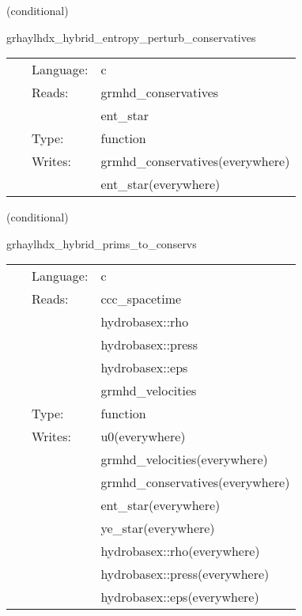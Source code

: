 \vspace{5mm}

   (conditional) 

\hspace{5mm} grhaylhdx\_hybrid\_entropy\_perturb\_conservatives 

\hspace{5mm}{\it entropy+hybrid version of grhaylhdx\_perturb\_conservatives } 


\hspace{5mm}

 \begin{tabular*}{160mm}{cll} 
~ & Language:  & c \\ 
~ & Reads:  & grmhd\_conservatives \\ 
~& ~ &ent\_star\\ 
~ & Type:  & function \\ 
~ & Writes:  & grmhd\_conservatives(everywhere) \\ 
~& ~ &ent\_star(everywhere)\\ 
\end{tabular*} 


\vspace{5mm}

   (conditional) 

\hspace{5mm} grhaylhdx\_hybrid\_prims\_to\_conservs 

\hspace{5mm}{\it hybrid version of grhaylhdx\_prims\_to\_conservs } 


\hspace{5mm}

 \begin{tabular*}{160mm}{cll} 
~ & Language:  & c \\ 
~ & Reads:  & ccc\_spacetime \\ 
~& ~ &hydrobasex::rho\\ 
~& ~ &hydrobasex::press\\ 
~& ~ &hydrobasex::eps\\ 
~& ~ &grmhd\_velocities\\ 
~ & Type:  & function \\ 
~ & Writes:  & u0(everywhere) \\ 
~& ~ &grmhd\_velocities(everywhere)\\ 
~& ~ &grmhd\_conservatives(everywhere)\\ 
~& ~ &ent\_star(everywhere)\\ 
~& ~ &ye\_star(everywhere)\\ 
~& ~ &hydrobasex::rho(everywhere)\\ 
~& ~ &hydrobasex::press(everywhere)\\ 
~& ~ &hydrobasex::eps(everywhere)\\ 
\end{tabular*} 


